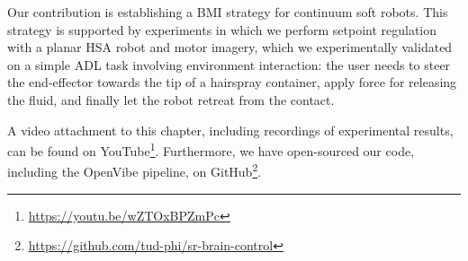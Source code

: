 Our contribution is establishing a \gls{BMI} strategy for continuum soft robots. This strategy is supported by experiments in which we perform setpoint regulation with a planar \gls{HSA} robot and motor imagery, which we experimentally validated on a simple \gls{ADL} task involving environment interaction: the user needs to steer the end-effector towards the tip of a hairspray container, apply force for releasing the fluid, and finally let the robot retreat from the contact.          

A video attachment to this chapter, including recordings of experimental results, can be found on YouTube\footnote{\url{https://youtu.be/wZTOxBPZmPc}}.
Furthermore, we have open-sourced our code, including the OpenVibe pipeline, on GitHub\footnote{\url{https://github.com/tud-phi/sr-brain-control}}.